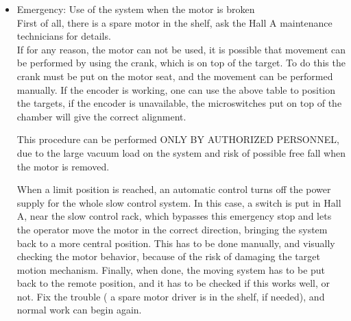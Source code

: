 {\begin{itemize}
\item Emergency: Use of the system when the motor is broken \\
First of all, there is a spare motor in the shelf, ask the Hall A
maintenance technicians for details. \\
If for any reason, the motor can not be used, it is possible that
movement can be performed by using the crank, which is on top of the
target. To do this the crank must be put on the motor seat, and the
movement can be performed manually. If the encoder is working, one
can use the above table to position the targets, if the encoder
is unavailable, the microswitches put on top of the chamber will give
the correct alignment. \\
\begin{safetyen}{10}{10}
This procedure can be performed ONLY BY AUTHORIZED PERSONNEL, due
to the large vacuum load on the system and risk of possible free fall
when the motor is removed.
\end{safetyen}
When a limit position is reached, an automatic control turns off the
power supply for the whole slow control system. In this case, a switch
is put in Hall A, near the slow control rack, which bypasses this
emergency stop and lets the operator move the motor in the correct
direction, bringing the system back to a more central position. This
has to be done manually, and visually checking the motor behavior,
because of the risk of damaging the target motion mechanism. Finally,
when done, the moving system has to be put back to the remote position,
and it has to be checked if this works well, or not. Fix the trouble
( a spare motor driver is in the shelf, if needed), and normal work
can begin again.
\end{itemize}

} %

